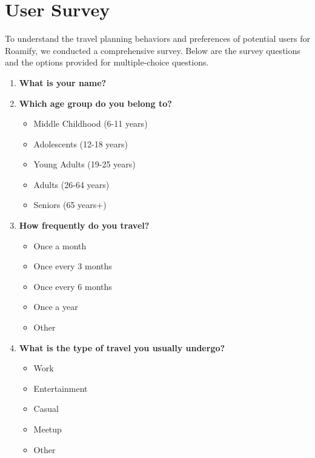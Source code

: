 \documentclass[conference]{IEEEtran}
\begin{document}
\newpage

\appendix

\section{User Survey}
    To understand the travel planning behaviors and preferences of potential users for Roamify, we conducted a comprehensive survey. Below are the survey questions and the options provided for multiple-choice questions.

    \begin{enumerate}
        \item \textbf{What is your name?}
        
        \item \textbf{Which age group do you belong to?}
        \begin{itemize}
            \item Middle Childhood (6-11 years)
            \item Adolescents (12-18 years)
            \item Young Adults (19-25 years)
            \item Adults (26-64 years)
            \item Seniors (65 years+)
        \end{itemize}
        
        \item \textbf{How frequently do you travel?}
        \begin{itemize}
            \item Once a month
            \item Once every 3 months
            \item Once every 6 months
            \item Once a year
            \item Other
        \end{itemize}
        
        \item \textbf{What is the type of travel you usually undergo?}
        \begin{itemize}
            \item Work
            \item Entertainment
            \item Casual
            \item Meetup
            \item Other
        \end{itemize}
        

\end{enumerate}
\end{document}
